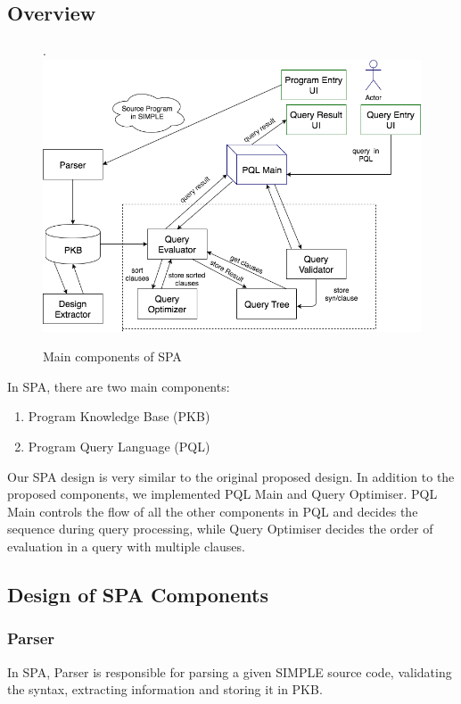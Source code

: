 \documentclass[12pt]{article}
\begin{document}
\subsection{Overview}
\begin{figure}[!htb].
\centering
\includegraphics[width=1.0\textwidth]{Architecture_Diagram.png}
\caption{\label{fig:Architecture}Main components of SPA}
\end{figure}
In  SPA, there are two main components:
\begin{enumerate}
\item Program Knowledge Base (PKB)
\item Program Query Language (PQL)
\end{enumerate}

Our SPA design is very similar to the original proposed design. In addition to the proposed components, we implemented PQL Main and Query Optimiser. PQL Main controls the flow of all the other components in PQL and decides the sequence during query processing, while Query Optimiser decides the order of evaluation in a query with multiple clauses.

\subsection{Design of SPA Components}

\subsubsection{Parser }
In SPA, Parser is responsible for parsing a given SIMPLE source code, validating the syntax, extracting information and storing it in PKB.
\end{document}
